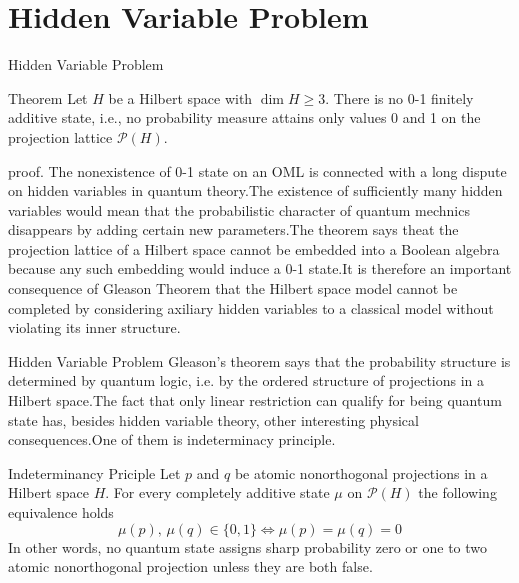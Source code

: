 \documentclass{beamer}
\begin{document}
\section{Hidden Variable Problem}
\begin{frame}{Hidden Variable Problem}
    \begin{block}{Theorem} Let \(H\) be a Hilbert space with \(\dim H \ge 3\). There is no 0-1 finitely additive state, i.e., no probability measure attains only values 0 and 1 on the projection lattice \(\mathcal{P}(H)\).
    \end{block}\pause
    proof. \cite[Theorem 3.4.1]{MR2015280}
    The nonexistence of 0-1 state on an OML is connected with a long dispute on hidden variables in quantum theory.\pause The existence of sufficiently many hidden variables would mean that the probabilistic character of quantum mechnics disappears by adding certain new parameters.\pause The theorem says theat the projection lattice of a Hilbert space cannot be embedded into a Boolean algebra because any such embedding would induce a 0-1 state.\pause It is therefore an important consequence of Gleason Theorem that the Hilbert space model cannot be completed by considering axiliary hidden variables to a classical model without violating its inner structure.

   
\end{frame}
\begin{frame}{Hidden Variable Problem}
 Gleason's theorem says that the probability structure is determined by quantum logic, i.e. by the ordered structure of projections in a Hilbert space.\pause The fact that only linear restriction can qualify for being quantum state has, besides hidden variable theory, other interesting physical consequences.\pause One of them is indeterminacy principle. \cite[p.87-93]{MR2015280}
 \begin{block}{Indeterminancy Priciple}
    Let \(p\) and \(q\) be atomic nonorthogonal projections in a Hilbert space \(H\). For every completely additive state \(\mu\) on \(\mathcal{P}(H)\) the following equivalence holds
    \[\mu(p),\,\mu(q) \in \{0,1\} \Leftrightarrow \mu(p)=\mu(q)=0\]
    In other words, no quantum state assigns sharp probability zero or one to two atomic nonorthogonal projection unless they are both false.
 \end{block}   
    
\end{frame}
\end{document}
